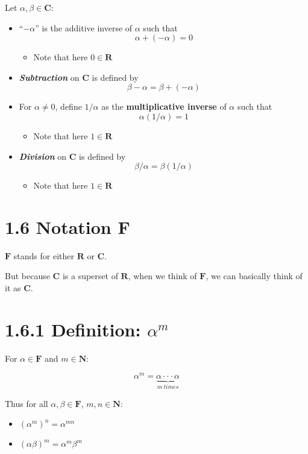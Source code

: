 \documentclass[12pt, letterpaper, oneside]{book}
\begin{document}
Let $\alpha, \beta \in \mathbf{C}$:

\begin{itemize}
  \item ``$-\alpha$'' is the additive inverse of $\alpha$ such that
    \[ \alpha + (-\alpha) = 0 \]
    \begin{itemize}
      \item Note that here $0 \in \mathbf{R}$
    \end{itemize}
  \item \textbf{\textit{Subtraction}} on $\mathbf{C}$ is defined by
    \[ \beta - \alpha = \beta + (-\alpha) \]
  \item For $\alpha \neq 0$, define $1/\alpha$ as the \textbf{multiplicative
    inverse} of $\alpha$ such that
    \[ \alpha(1/\alpha) = 1 \]
    \begin{itemize}
      \item Note that here $1 \in \mathbf{R}$
    \end{itemize}
  \item \textbf{\textit{Division}} on $\mathbf{C}$ is defined by
    \[ \beta/\alpha = \beta(1/\alpha) \]
    \begin{itemize}
      \item Note that here $1 \in \mathbf{R}$
    \end{itemize}
\end{itemize}

\section*{1.6 Notation F}

$\mathbf{F}$ stands for either $\mathbf{R}$ or $\mathbf{C}$.

But because $\mathbf{C}$ is a superset of $\mathbf{R}$, when we think of
$\mathbf{F}$, we can basically think of it as $\mathbf{C}$.

\section*{1.6.1 Definition: $\alpha^m$}

For $\alpha \in \mathbf{F}$ and $m \in \mathbf{N}$:

\[ \alpha^m = \underbrace{\alpha\cdot\cdot\cdot\alpha}_{m \ times} \]

Thus for all $\alpha, \beta \in \mathbf{F}$, $m, n \in \mathbf{N}$:

\begin{itemize}
  \item $(\alpha^m)^n = \alpha^{mn}$
  \item $(\alpha\beta)^m = \alpha^m\beta^m$
\end{itemize}
\end{document}
